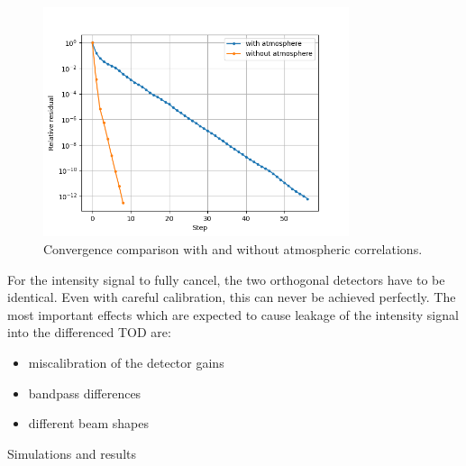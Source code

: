 \documentclass[final]{beamer}
\newlength{\colwidth}
\begin{document}
\begin{frame}[t]
\begin{columns}[t]
\begin{column}{\colwidth}
\begin{block}{}
        \begin{figure}
          \centering
          \includegraphics[width=0.8\textwidth]{figures/convergence.png}
          \caption{Convergence comparison with and without atmospheric correlations.}
          \label{fig:convergence}
        \end{figure}


        For the intensity signal to fully cancel, the two orthogonal detectors have to be identical.
        Even with careful calibration, this can never be achieved perfectly.
        The most important effects which are expected to cause leakage of the intensity signal into the differenced TOD are:

        \begin{itemize}
          \item miscalibration of the detector gains
          \item bandpass differences
          \item different beam shapes
        \end{itemize}

      \end{block}

      \begin{block}{Simulations and results}



\end{block}
\end{column}
\end{columns}
\end{frame}
\end{document}
